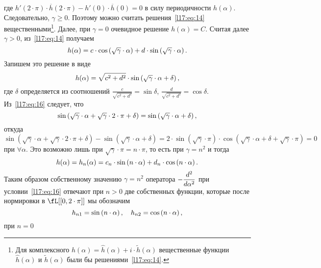 где $h'(2\cdot\pi)\cdot\overline{h}(2\cdot\pi)-h'(0)\cdot \overline{h}(0)=0$ в силу периодичности $h(\alpha)$. Следовательно, $\gamma\geqslant0$. Поэтому можно считать решения~\eqref{l17:eq:14} вещественными\footnote{Для комплексного $h(\alpha)=\widehat{h}(\alpha)+i\cdot\widetilde{h}(\alpha)$ вещественные функции $\widehat{h}(\alpha)$ и $\widetilde{h}(\alpha)$ были бы решениями~\eqref{l17:eq:14}.}. Далее, при $\gamma=0$ очевидное решение $h(\alpha)=C$. Считая далее $\gamma>0$, из~\eqref{l17:eq:14} получаем 
\begin{equation*}
	\hfill h(\alpha)=c\cdot\cos\left(\sqrt{\gamma}\cdot\alpha\right)+d\cdot\sin\left(\sqrt{\gamma}\cdot\alpha\right).\hfill
\end{equation*} 
Запишем это решение в виде
\begin{equation*}
	\hfill h(\alpha)=\sqrt{c^2+d^2}\cdot\sin\left(\sqrt{\gamma}\cdot\alpha+\delta\right),\hfill
\end{equation*}
где $\delta$ определяется из соотношений $\displaystyle \frac{c}{\sqrt{c^2+d^2}}=\sin\delta$, $\displaystyle \frac{d}{\sqrt{c^2+d^2}}=\cos\delta$. Из~\eqref{l17:eq:16} следует, что 
\begin{equation*}
	\hfill\sin\left(\sqrt{\gamma}\cdot\alpha+\sqrt{\gamma}\cdot2\cdot\pi+\delta\right)=\sin\left(\sqrt{\gamma}\cdot\alpha+\delta\right),\hfill
\end{equation*}
откуда
\begin{equation*}
	\sin\left(\sqrt{\gamma}\cdot\alpha+\sqrt{\gamma}\cdot 2\cdot\pi+\delta\right)-\sin\left(\sqrt{\gamma}\cdot\alpha+\delta\right)=2\cdot\sin\left(\sqrt{\gamma}\cdot\pi\right)\cdot\cos\left(\sqrt{\gamma}\cdot\alpha+\delta+\sqrt{\gamma}\cdot\pi\right)=0
\end{equation*}
при $\forall\alpha$. Это возможно лишь при $\sqrt{\gamma}\cdot \pi=n\cdot \pi$, то есть при $\gamma=n^2$ и тогда 
\begin{equation*}
	\hfill h(\alpha)=h_{n}(\alpha)=c_n\cdot\sin\left(n\cdot \alpha\right)+d_n\cdot\cos\left(n\cdot \alpha\right). \hfill
\end{equation*} 
Таким образом собственному значению $\gamma=n^2$ оператора $\displaystyle-\frac{d^2}{d\alpha^2}$ при условии~\eqref{l17:eq:16} отвечают при $n>0$ две собственных функции, которые после нормировки в $\displaystyle\fL[{[0,2\cdot\pi]}]$ мы обозначим 
\begin{equation*}
	\hfill h_{n1}=\sin\left(n\cdot \alpha\right),\quad h_{n2}=\cos\left(n\cdot \alpha\right),\hfill
\end{equation*}
при $n=0$
